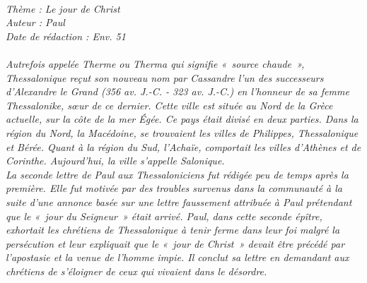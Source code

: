 \BFont
\noindent\hrulefill
{\footnotesize
\textit{
\bigskip
{\centering{}
\\Thème : Le jour de Christ
\\Auteur : Paul
\\Date de rédaction : Env. 51\\}
}
\textit{
\\Autrefois appelée Therme ou Therma qui signifie « source chaude », Thessalonique reçut son nouveau nom par  Cassandre l’un des successeurs  d’Alexandre le Grand (356 av. J.-C. - 323 av. J.-C.) en l’honneur de sa femme Thessalonike, sœur  de ce dernier. Cette ville est située au Nord de la Grèce actuelle, sur la côte de la mer Égée. Ce pays était divisé en deux parties. Dans la région du Nord, la Macédoine, se trouvaient les villes de Philippes, Thessalonique et Bérée. Quant à la région du Sud, l’Achaïe, comportait les villes d’Athènes et de Corinthe. Aujourd’hui, la ville s’appelle Salonique.
\\La seconde lettre de Paul aux Thessaloniciens fut rédigée peu de temps après la première. Elle fut motivée par des troubles survenus dans la communauté à la suite d'une annonce basée sur une lettre faussement attribuée à Paul prétendant que le «~jour du Seigneur~» était arrivé. Paul, dans cette seconde épître, exhortait les chrétiens de Thessalonique à tenir ferme dans leur foi malgré la persécution et leur expliquait que le « jour de Christ » devait être précédé par l’apostasie et la venue de l’homme impie. Il conclut sa lettre en demandant aux chrétiens de s’éloigner de ceux qui vivaient dans le désordre.\bigskip
}
}
\par\nobreak\noindent\hrulefill
